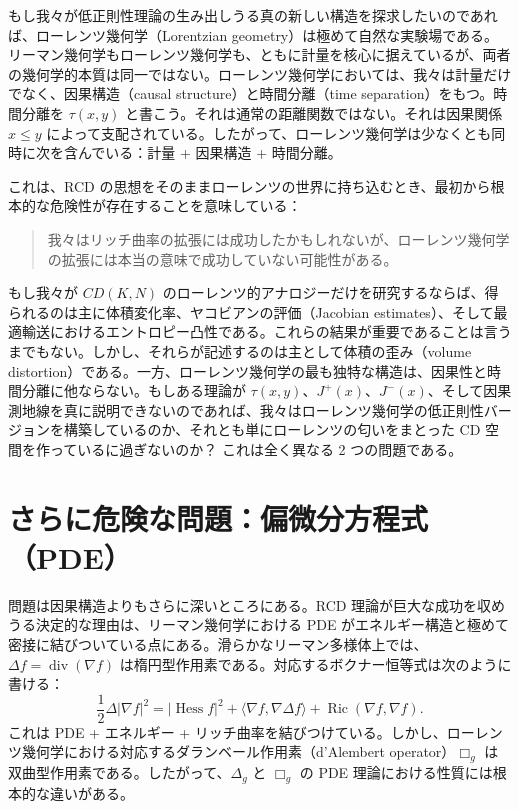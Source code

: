 \documentclass[lualatex]{ltjsarticle}
\begin{document}
もし我々が低正則性理論の生み出しうる真の新しい構造を探求したいのであれば、ローレンツ幾何学（Lorentzian geometry）は極めて自然な実験場である。リーマン幾何学もローレンツ幾何学も、ともに計量を核心に据えているが、両者の幾何学的本質は同一ではない。ローレンツ幾何学においては、我々は計量だけでなく、因果構造（causal structure）と時間分離（time separation）をもつ。時間分離を $\tau(x,y)$ と書こう。それは通常の距離関数ではない。それは因果関係 $x \leq y$ によって支配されている。したがって、ローレンツ幾何学は少なくとも同時に次を含んでいる：計量 + 因果構造 + 時間分離。

これは、RCD の思想をそのままローレンツの世界に持ち込むとき、最初から根本的な危険性が存在することを意味している：

\begin{quote}
我々はリッチ曲率の拡張には成功したかもしれないが、ローレンツ幾何学の拡張には本当の意味で成功していない可能性がある。
\end{quote}

もし我々が $CD(K,N)$ のローレンツ的アナロジーだけを研究するならば、得られるのは主に体積変化率、ヤコビアンの評価（Jacobian estimates）、そして最適輸送におけるエントロピー凸性である。これらの結果が重要であることは言うまでもない。しかし、それらが記述するのは主として体積の歪み（volume distortion）である。一方、ローレンツ幾何学の最も独特な構造は、因果性と時間分離に他ならない。もしある理論が $\tau(x,y)$、$J^+(x)$、$J^-(x)$、そして因果測地線を真に説明できないのであれば、我々はローレンツ幾何学の低正則性バージョンを構築しているのか、それとも単にローレンツの匂いをまとった CD 空間を作っているに過ぎないのか？ これは全く異なる 2 つの問題である。

\section{さらに危険な問題：偏微分方程式（PDE）}

問題は因果構造よりもさらに深いところにある。RCD 理論が巨大な成功を収めうる決定的な理由は、リーマン幾何学における PDE がエネルギー構造と極めて密接に結びついている点にある。滑らかなリーマン多様体上では、$\Delta f = \operatorname{div}(\nabla f)$ は楕円型作用素である。対応するボクナー恒等式は次のように書ける：
\[
\frac{1}{2}\Delta |\nabla f|^2 = |\operatorname{Hess}f|^2 + \langle \nabla f, \nabla\Delta f \rangle + \operatorname{Ric}(\nabla f,\nabla f).
\]
これは PDE + エネルギー + リッチ曲率を結びつけている。しかし、ローレンツ幾何学における対応するダランベール作用素（d'Alembert operator）$\Box_g$ は双曲型作用素である。したがって、$\Delta_g$ と $\Box_g$ の PDE 理論における性質には根本的な違いがある。
\end{document}
